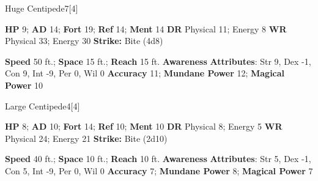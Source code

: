   \begin{monsection}{Huge Centipede}{7}[4]
    \vspace{-1em}\vspace{-1em}
    \begin{spellcontent}
      \begin{spelltargetinginfo}
        \pari \textbf{HP} 9;
          \textbf{AD} 14;
          \textbf{Fort} 19;
          \textbf{Ref} 14;
          \textbf{Ment} 14
        \pari \textbf{DR} Physical 11; Energy 8
        \pari \textbf{WR} Physical 33; Energy 30
        \pari \textbf{Strike:}
            Bite  (4d8)
      \end{spelltargetinginfo}
    \end{spellcontent}
    \begin{monsterfooter}
      \pari \textbf{Speed} 50 ft.;
        \textbf{Space} 15 ft.;
        \textbf{Reach} 15 ft.
      \pari \textbf{Awareness} 
      \pari \textbf{Attributes}:
        Str 9, Dex -1, Con 9,
        Int -9, Per 0, Wil 0
      \pari \textbf{Accuracy} 11;
        \textbf{Mundane Power} 12;
      \textbf{Magical Power} 10
    \end{monsterfooter}
  \end{monsection}
  
  
  \begin{monsection}{Large Centipede}{4}[4]
    \vspace{-1em}\vspace{-1em}
    \begin{spellcontent}
      \begin{spelltargetinginfo}
        \pari \textbf{HP} 8;
          \textbf{AD} 10;
          \textbf{Fort} 14;
          \textbf{Ref} 10;
          \textbf{Ment} 10
        \pari \textbf{DR} Physical 8; Energy 5
        \pari \textbf{WR} Physical 24; Energy 21
        \pari \textbf{Strike:}
            Bite  (2d10)
      \end{spelltargetinginfo}
    \end{spellcontent}
    \begin{monsterfooter}
      \pari \textbf{Speed} 40 ft.;
        \textbf{Space} 10 ft.;
        \textbf{Reach} 10 ft.
      \pari \textbf{Awareness} 
      \pari \textbf{Attributes}:
        Str 5, Dex -1, Con 5,
        Int -9, Per 0, Wil 0
      \pari \textbf{Accuracy} 7;
        \textbf{Mundane Power} 8;
      \textbf{Magical Power} 7
    \end{monsterfooter}
  \end{monsection}
  
